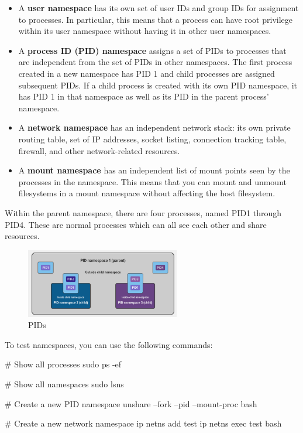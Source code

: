 \begin{itemize}
    \item A \textbf{user namespace} has its own set of user IDs and group IDs for assignment to
    processes. In particular, this means that a process can have root privilege within its
    user namespace without having it in other user namespaces.
    \item A \textbf{process ID (PID) namespace} assigns a set of PIDs to processes that are
    independent from the set of PIDs in other namespaces. The first process created in
    a new namespace has PID 1 and child processes are assigned subsequent PIDs. If a
    child process is created with its own PID namespace, it has PID 1 in that namespace
    as well as its PID in the parent process’ namespace.
    \item A \textbf{network namespace} has an independent network stack: its own private routing
    table, set of IP addresses, socket listing, connection tracking table, firewall, and
    other network-related resources.
    \item A \textbf{mount namespace} has an independent list of mount points seen by the processes
    in the namespace. This means that you can mount and unmount filesystems in a
    mount namespace without affecting the host filesystem.
\end{itemize}

Within the parent namespace, there are four processes, named PID1 through PID4. These are normal processes which can all see each other and share resources.

\begin{figure}[H]
    \centering
    \includegraphics[width=0.6\textwidth]{assets/fig36.png}
    \caption{PIDs}
\end{figure}

To test namespaces, you can use the following commands:
\begin{codeblock}[language=bash]
    # Show all processes
    sudo ps -ef 

    # Show all namespaces
    sudo lsns 

    # Create a new PID namespace
    unshare --fork --pid --mount-proc bash
    
    # Create a new network namespace
    ip netns add test
    ip netns exec test bash
\end{codeblock}

